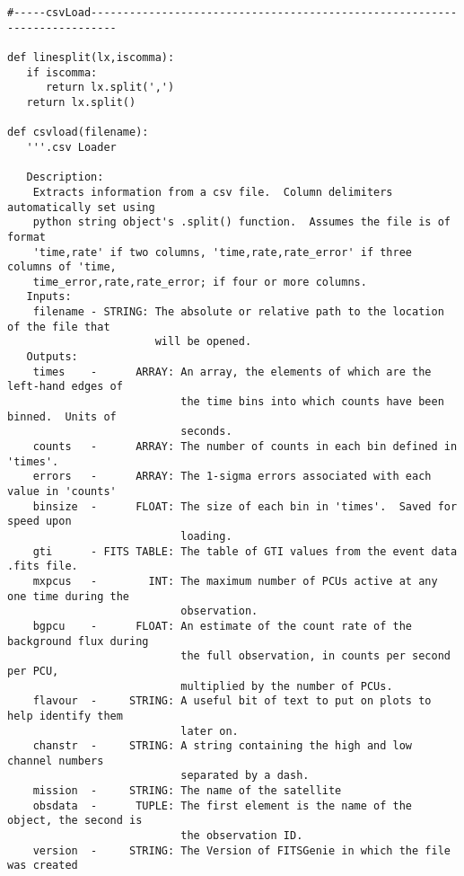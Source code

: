 \begin{verbatim}
#-----csvLoad--------------------------------------------------------------------------

def linesplit(lx,iscomma):
   if iscomma:
      return lx.split(',')
   return lx.split()

def csvload(filename):
   '''.csv Loader
   
   Description:
    Extracts information from a csv file.  Column delimiters automatically set using
    python string object's .split() function.  Assumes the file is of format
    'time,rate' if two columns, 'time,rate,rate_error' if three columns of 'time,
    time_error,rate,rate_error; if four or more columns.
   Inputs:
    filename - STRING: The absolute or relative path to the location of the file that
                       will be opened.
   Outputs:
    times    -      ARRAY: An array, the elements of which are the left-hand edges of
                           the time bins into which counts have been binned.  Units of
                           seconds.
    counts   -      ARRAY: The number of counts in each bin defined in 'times'.
    errors   -      ARRAY: The 1-sigma errors associated with each value in 'counts'
    binsize  -      FLOAT: The size of each bin in 'times'.  Saved for speed upon
                           loading.
    gti      - FITS TABLE: The table of GTI values from the event data .fits file.
    mxpcus   -        INT: The maximum number of PCUs active at any one time during the
                           observation.
    bgpcu    -      FLOAT: An estimate of the count rate of the background flux during
                           the full observation, in counts per second per PCU,
                           multiplied by the number of PCUs.
    flavour  -     STRING: A useful bit of text to put on plots to help identify them
                           later on.
    chanstr  -     STRING: A string containing the high and low channel numbers
                           separated by a dash.
    mission  -     STRING: The name of the satellite
    obsdata  -      TUPLE: The first element is the name of the object, the second is
                           the observation ID.
    version  -     STRING: The Version of FITSGenie in which the file was created


\end{verbatim}
